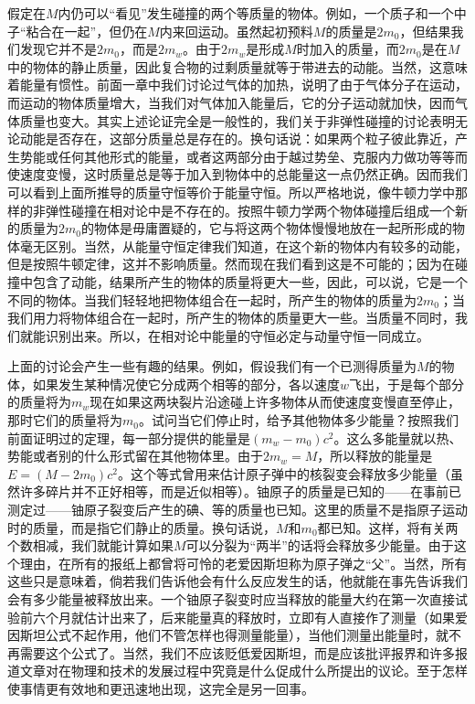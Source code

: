 假定在$M$内仍可以“看见”发生碰撞的两个等质量的物体。例如，一个质子和一个中子“粘合在一起”，但仍在$M$内来回运动。虽然起初预料$M$的质量是$2m_0$，但结果我们发现它并不是$2m_0$，而是$2m_w$。由于$2m_w$是形成$M$时加入的质量，而$2m_0$是在$M$中的物体的静止质量，因此复合物的过剩质量就等于带进去的动能。当然，这意味着能量有惯性。前面一章中我们讨论过气体的加热，说明了由于气体分子在运动，而运动的物体质量增大，当我们对气体加入能量后，它的分子运动就加快，因而气体质量也变大。其实上述论证完全是一般性的，我们关于非弹性碰撞的讨论表明无论动能是否存在，这部分质量总是存在的。换句话说：如果两个粒子彼此靠近，产生势能或任何其他形式的能量，或者这两部分由于越过势垒、克服内力做功等等而使速度变慢，这时质量总是等于加入到物体中的总能量这一点仍然正确。因而我们可以看到上面所推导的质量守恒等价于能量守恒。所以严格地说，像牛顿力学中那样的非弹性碰撞在相对论中是不存在的。按照牛顿力学两个物体碰撞后组成一个新的质量为$2m_0$的物体是毋庸置疑的，它与将这两个物体慢慢地放在一起所形成的物体毫无区别。当然，从能量守恒定律我们知道，在这个新的物体内有较多的动能，但是按照牛顿定律，这并不影响质量。然而现在我们看到这是不可能的；因为在碰撞中包含了动能，结果所产生的物体的质量将更大一些，因此，可以说，它是一个不同的物体。当我们轻轻地把物体组合在一起时，所产生的物体的质量为$2m_0$；当我们用力将物体组合在一起时，所产生的物体的质量更大一些。当质量不同时，我们就能识别出来。所以，在相对论中能量的守恒必定与动量守恒一同成立。

上面的讨论会产生一些有趣的结果。例如，假设我们有一个已测得质量为$M$的物体，如果发生某种情况使它分成两个相等的部分，各以速度$w$飞出，于是每个部分的质量将为$m_w$现在如果这两块裂片沿途碰上许多物体从而使速度变慢直至停止，那时它们的质量将为$m_0$。试问当它们停止时，给予其他物体多少能量？按照我们前面证明过的定理，每一部分提供的能量是$(m_w-m_0)c^2$。这么多能量就以热、势能或者别的什么形式留在其他物体里。由于$2m_w=M$，所以释放的能量是$E=(M-2m_0)c^2$。这个等式曾用来估计原子弹中的核裂变会释放多少能量（虽然许多碎片并不正好相等，而是近似相等）。铀原子的质量是已知的——在事前已测定过——铀原子裂变后产生的碘、等的质量也已知。这里的质量不是指原子运动时的质量，而是指它们静止的质量。换句话说，$M$和$m_0$都已知。这样，将有关两个数相减，我们就能计算如果$M$可以分裂为“两半”的话将会释放多少能量。由于这个理由，在所有的报纸上都曾将可怜的老爱因斯坦称为原子弹之“父”。当然，所有这些只是意味着，倘若我们告诉他会有什么反应发生的话，他就能在事先告诉我们会有多少能量被释放出来。一个铀原子裂变时应当释放的能量大约在第一次直接试验前六个月就估计出来了，后来能量真的释放时，立即有人直接作了测量（如果爱因斯坦公式不起作用，他们不管怎样也得测量能量），当他们测量出能量时，就不再需要这个公式了。当然，我们不应该贬低爱因斯坦，而是应该批评报界和许多报道文章对在物理和技术的发展过程中究竟是什么促成什么所提出的议论。至于怎样使事情更有效地和更迅速地出现，这完全是另一回事。

